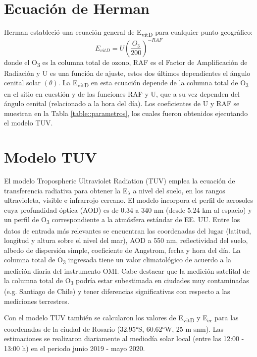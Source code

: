 \documentclass[10pt,twocolumn]{article}
\begin{document}
\section{Ecuación de Herman}
Herman\cite{Herman2010} estableció una ecuación general de E\textsubscript{vitD} para cualquier punto geográfico:
\begin{equation}
  E_{vitD}=U\left(\frac{O_3}{200}\right)^{-RAF}
  \label{eq:evitd}
\end{equation}
donde el O\textsubscript{3} es la columna total de ozono, RAF es el Factor de Amplificación de Radiación y U es una función de ajuste, estos dos últimos dependientes el ángulo cenital solar $(\theta)$. La E\textsubscript{vitD} en esta ecuación depende de la columna total de O\textsubscript{3} en el sitio en cuestión y de las funciones RAF y U, que a su vez dependen del ángulo cenital (relacionado a la hora del día). Los coeficientes de U y RAF se muestran en la Tabla \ref{table::parametros}, los cuales fueron obtenidos ejecutando el modelo TUV.

\section{Modelo TUV}
El modelo Tropospheric Ultraviolet Radiation (TUV)\cite{Madronich1987} emplea la ecuación de transferencia radiativa para obtener la E$_\lambda$ a nivel del suelo, en los rangos ultravioleta, visible e infrarrojo cercano. El modelo incorpora el perfil de aerosoles cuya profundidad óptica (AOD) es de 0.34 a 340 nm (desde 5.24 km al espacio) y un perfil de O\textsubscript{3} correspondiente a la atmósfera estándar de EE. UU. Entre los datos de entrada más relevantes se encuentran las coordenadas del lugar (latitud, longitud y altura sobre el nivel del mar), AOD a 550 nm, reflectividad del suelo, albedo de dispersión simple, coeficiente de Angstrom, fecha y hora del día. La columna total de O\textsubscript{3} ingresada tiene un valor climatológico de acuerdo a la medición diaria del instrumento OMI. Cabe destacar que la medición satelital de la columna total de O\textsubscript{3} podría estar subestimada en ciudades muy contaminadas (e.g. Santiago de Chile) y tener diferencias significativas con respecto a las mediciones terrestres.

Con el modelo TUV también se calcularon los valores de E\textsubscript{vitD} y E\textsubscript{er} para las coordenadas de la ciudad de Rosario (32.95°S, 60.62°W, 25 m snm). Las estimaciones se realizaron diariamente al mediodía solar local (entre las 12:00 - 13:00 h) en el periodo junio 2019 - mayo 2020.
\end{document}
